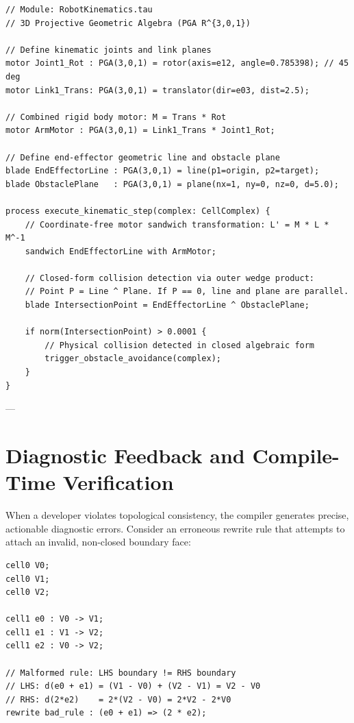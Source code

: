 \begin{lstlisting}[caption={Continuous Robotic Kinematics with PGA Versors and Collision Checking.}]
// Module: RobotKinematics.tau
// 3D Projective Geometric Algebra (PGA R^{3,0,1})

// Define kinematic joints and link planes
motor Joint1_Rot : PGA(3,0,1) = rotor(axis=e12, angle=0.785398); // 45 deg
motor Link1_Trans: PGA(3,0,1) = translator(dir=e03, dist=2.5);

// Combined rigid body motor: M = Trans * Rot
motor ArmMotor : PGA(3,0,1) = Link1_Trans * Joint1_Rot;

// Define end-effector geometric line and obstacle plane
blade EndEffectorLine : PGA(3,0,1) = line(p1=origin, p2=target);
blade ObstaclePlane   : PGA(3,0,1) = plane(nx=1, ny=0, nz=0, d=5.0);

process execute_kinematic_step(complex: CellComplex) {
    // Coordinate-free motor sandwich transformation: L' = M * L * M^-1
    sandwich EndEffectorLine with ArmMotor;

    // Closed-form collision detection via outer wedge product:
    // Point P = Line ^ Plane. If P == 0, line and plane are parallel.
    blade IntersectionPoint = EndEffectorLine ^ ObstaclePlane;

    if norm(IntersectionPoint) > 0.0001 {
        // Physical collision detected in closed algebraic form
        trigger_obstacle_avoidance(complex);
    }
}
\end{lstlisting}

---

\section{Diagnostic Feedback and Compile-Time Verification}
\label{sec:diagnostics}

When a developer violates topological consistency, the \ToposLang{} compiler generates precise, actionable diagnostic errors. Consider an erroneous rewrite rule that attempts to attach an invalid, non-closed boundary face:

\begin{lstlisting}[caption={Erroneous \ToposLang{} Program with Boundary Nilpotency Violation.}]
cell0 V0;
cell0 V1;
cell0 V2;

cell1 e0 : V0 -> V1;
cell1 e1 : V1 -> V2;
cell1 e2 : V0 -> V2;

// Malformed rule: LHS boundary != RHS boundary
// LHS: d(e0 + e1) = (V1 - V0) + (V2 - V1) = V2 - V0
// RHS: d(2*e2)    = 2*(V2 - V0) = 2*V2 - 2*V0
rewrite bad_rule : (e0 + e1) => (2 * e2);
\end{lstlisting}

